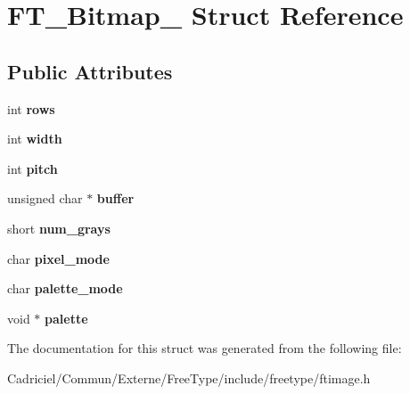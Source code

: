 \hypertarget{struct_f_t___bitmap__}{}\section{F\+T\+\_\+\+Bitmap\+\_\+ Struct Reference}
\label{struct_f_t___bitmap__}
\subsection*{Public Attributes}
\begin{DoxyCompactItemize}
\item 
int {\bfseries rows}\hypertarget{struct_f_t___bitmap___a1b6bb20b30fe087e3fc87a0eb37730c0}{}\label{struct_f_t___bitmap___a1b6bb20b30fe087e3fc87a0eb37730c0}

\item 
int {\bfseries width}\hypertarget{struct_f_t___bitmap___a7b5e6252dd91a3809fe80ebbeb6720eb}{}\label{struct_f_t___bitmap___a7b5e6252dd91a3809fe80ebbeb6720eb}

\item 
int {\bfseries pitch}\hypertarget{struct_f_t___bitmap___afdee595846e1188c7a76d0cec9d85cf2}{}\label{struct_f_t___bitmap___afdee595846e1188c7a76d0cec9d85cf2}

\item 
unsigned char $\ast$ {\bfseries buffer}\hypertarget{struct_f_t___bitmap___a76439b1d3c13b81ca506108cd1623284}{}\label{struct_f_t___bitmap___a76439b1d3c13b81ca506108cd1623284}

\item 
short {\bfseries num\+\_\+grays}\hypertarget{struct_f_t___bitmap___a415d78060f8012d312703c9792ec005a}{}\label{struct_f_t___bitmap___a415d78060f8012d312703c9792ec005a}

\item 
char {\bfseries pixel\+\_\+mode}\hypertarget{struct_f_t___bitmap___a5cc5e0fe42a93a86e16706ad52e087a2}{}\label{struct_f_t___bitmap___a5cc5e0fe42a93a86e16706ad52e087a2}

\item 
char {\bfseries palette\+\_\+mode}\hypertarget{struct_f_t___bitmap___ae7c8c74255cd27873b12a360cd5f3884}{}\label{struct_f_t___bitmap___ae7c8c74255cd27873b12a360cd5f3884}

\item 
void $\ast$ {\bfseries palette}\hypertarget{struct_f_t___bitmap___a8d5ecf4409f71bfb559e0d13d8df4d86}{}\label{struct_f_t___bitmap___a8d5ecf4409f71bfb559e0d13d8df4d86}

\end{DoxyCompactItemize}


The documentation for this struct was generated from the following file\+:\begin{DoxyCompactItemize}
\item 
Cadriciel/\+Commun/\+Externe/\+Free\+Type/include/freetype/ftimage.\+h\end{DoxyCompactItemize}
